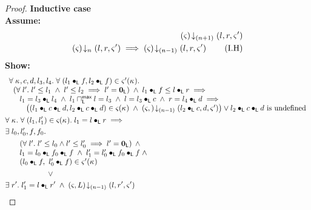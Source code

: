 \begin{lemma}[]
\begin{proof}
\noindent\textbf{Inductive case}\\
\textbf{Assume:}
%
\begin{align}
	\left(\varsigma_{}\right) \!\downarrow_{(n+1)} \left(l, r, \varsigma_{}'\right) \label{L9:Ass1}\\
	\left(\varsigma_{}\right) \!\downarrow_{n} \left(l, r, \varsigma_{}'\right) \implies \left(\varsigma_{}\right) \!\downarrow_{(n-1)} \left(l, r, \varsigma_{}'\right) \tag{I.H} \label{L9:I.H}
\end{align}
%
\textbf{Show:}
%
\begin{align}
	&\begin{array}{l}
			\for{\ca{}, c, d, l_3, l_4} \for{(l_1 \composeL f, l_2 \composeL f) \in \amod{}'(\ca{})} \\
%			
			\hspace*{0.2cm}\left(\for{l'} l' \leq l_1 \;\land\; l' \leq l_2 \implies l' = \unitL \right) \;\land\; l_1 \composeL f \leq l \composeL r \implies\\
%			
			\hspace*{0.5cm} l_1 = l_3 \composeL l_4 \;\land\; 	l_1 \maxMeetL l = l_3 \;\land\; l = l_3 \composeL c \;\land\; r = l_4 \composeL d \implies \\
%			
			\hspace*{0.8cm} \left((l_1 \composeL c \composeL d, l_2 \composeL c \composeL d) \in \amod{}(\ca{}) 
			\;\land\;
			\extendsAMUpto{\amod{}, }{(n-1)}{l_2 \composeL c}{d}{\amod{}'}\right) \lor l_2 \composeL c \composeL d \text{ is undefined} 	
	\end{array}\label{L9:Goal1}\\
%
  &\for{\ca{}} \for{(l_1, l'_1) \in \amod{}(\ca{})} l_1 = l \composeL r \implies \nonumber\\
	&\exsts{l_0, l'_0, f, f_0} \nonumber\\
  &\hspace*{0.5cm}
  \begin{array}{l}
  	\left(\for{l'} l' \leq l_0 \land l' \leq l'_0 \implies l' = \unitL \right)\;\land\\
  	l_1 = l_0 \composeL f_0 \composeL f \;\land\; l'_1 = l'_0 \composeL f_0 \composeL f \;\land\\
  	(l_0 \composeL f,\ l'_0 \composeL f) \in \amod{}'(\ca{}) 
  \end{array} \nonumber\\
%
	&\hspace*{2cm}\lor  \nonumber\\
	&\exsts{r'} l'_1 = l \composeL r' \;\land\; \extendsAMUpto{\amod{}, L}{(n-1)}{l}{r'}{\amod{}'} \label{L9:Goal2}
\end{align}
%


\end{proof}
\end{lemma}
